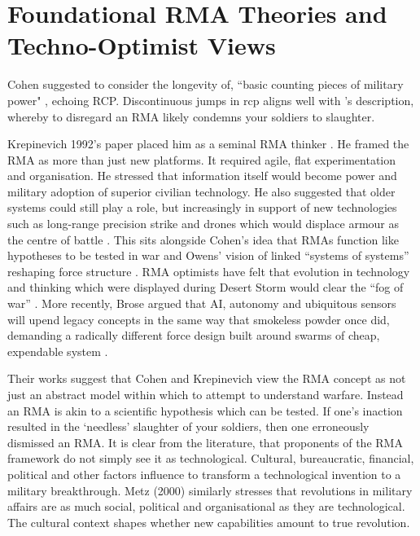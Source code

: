 \section{Foundational RMA Theories and Techno-Optimist Views}

Cohen suggested to consider the longevity of, ``basic counting pieces of
military power"  \parencite{COHEN_1995}, echoing RCP. Discontinuous jumps in \gls{rcp} aligns well with \textcite{KREPINEVICH_1992}'s description, whereby to disregard an RMA likely condemns your soldiers to slaughter. 

Krepinevich 1992's paper placed him as a seminal RMA thinker \nocite{KREPINEVICH_1992}. He framed the RMA as more than just new platforms. It required agile, flat experimentation and organisation. He stressed that information itself would become power and military adoption of superior civilian technology. He also suggested that older systems could still play a role, but increasingly in support of new technologies such as long-range precision strike and drones which would displace armour as the centre of battle \nocite{KREPINEVICH_1992}. %
 This sits alongside Cohen’s idea that RMAs function like hypotheses to be tested in war \parencite{COHEN_1996} and Owens’ vision of linked “systems of systems” reshaping force structure \parencite{OWENS_2002}. RMA optimists have felt that evolution in technology and thinking which were displayed during Desert Storm would clear the ``fog of war''  \parencite[p.~49]{ALACH_2008}. More recently, Brose argued that AI, autonomy and ubiquitous sensors will upend legacy concepts in the same way that smokeless powder once did, demanding a radically different force design built around swarms of cheap, expendable system \parencite{BROSE_2019}.

Their works suggest that Cohen and Krepinevich view the RMA concept as not just an abstract model within which to attempt to understand warfare. Instead an RMA is akin to a scientific hypothesis which can be tested. If one's inaction resulted in the `needless' slaughter of your soldiers, then one erroneously dismissed an RMA. It is clear from the literature, that proponents of the RMA framework do not simply see it as technological. Cultural, bureaucratic, financial, political and other factors influence to transform a technological invention to a military breakthrough. Metz (2000) similarly stresses that revolutions in military affairs are as much social, political and organisational as they are technological\nocite{METZ_2000}. The cultural context shapes whether new capabilities amount to true revolution.

